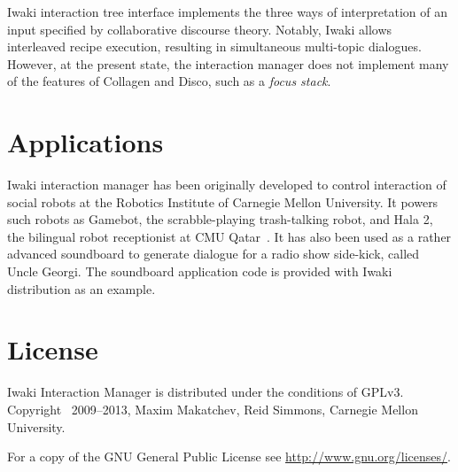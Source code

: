 Iwaki interaction tree interface implements the three ways of interpretation of an input specified by collaborative discourse theory. Notably, Iwaki allows interleaved recipe execution, resulting in simultaneous multi-topic dialogues. However, at the present state, the interaction manager does not implement many of the features of Collagen and Disco, such as a \textsl{focus stack}.

\section{Applications}


Iwaki interaction manager has been originally developed to control interaction of social robots at the Robotics Institute of Carnegie Mellon University. It powers such robots as Gamebot, the scrabble-playing trash-talking robot, and Hala 2, the bilingual robot receptionist at CMU Qatar~\citep{Simmons2011}. It has also been used as a rather advanced soundboard to generate dialogue for a radio show side-kick, called Uncle Georgi. The soundboard application code is provided with Iwaki distribution as an example.

\section{License}

Iwaki Interaction Manager is distributed under the conditions of GPLv3. Copyright \textcopyright\ 2009--2013, Maxim Makatchev, Reid Simmons, Carnegie Mellon University. 

For a copy of the GNU General Public License see \url{http://www.gnu.org/licenses/}.